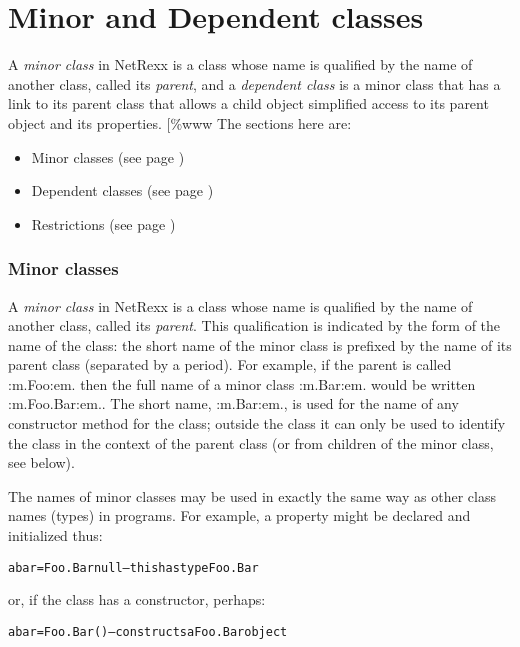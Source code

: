 \chapter{Minor and Dependent classes}\label{"id"}
 
A \emph{minor class} in NetRexx is a class whose name is qualified by
the name of another class, called its \emph{parent}, and a
\emph{dependent class} is a minor class that has a link to its parent
class that allows a child object simplified access to its parent
object and its properties.
[\%www
 The sections here are:
\begin{itemize}
\item  Minor classes (see page \pageref{refsminorc}) 
\item  Dependent classes (see page \pageref{refsdepen}) 
\item  Restrictions (see page \pageref{refsminres}) 
\end{itemize}
\subsection{Minor classes}\label{"id"}
\index{,}
\index{,}
\index{,}
\index{,}
 
A \emph{minor class} in NetRexx is a class whose name is qualified by
the name of another class, called its \emph{parent}.
This qualification is indicated by the form of the name of the class:
the short name of the minor class is prefixed by the name of its parent
class (separated by a period).
For example, if the parent is called :m.Foo:em. then the full name of a
minor class :m.Bar:em. would be written :m.Foo.Bar:em..
The short name, :m.Bar:em., is used for the name of any constructor
method for the class; outside the class it can only be used to identify
the class in the context of the parent class (or from children of the
minor class, see below).
 
The names of minor classes may be used in exactly the same way as
other class names (types) in programs.  For example, a property might be
declared and initialized thus:
\begin{alltt}
abar=Foo.Bar null   -- this has type Foo.Bar
\end{alltt}
or, if the class has a constructor, perhaps:
\begin{alltt}
abar=Foo.Bar()      -- constructs a Foo.Bar object
\end{alltt}
 

